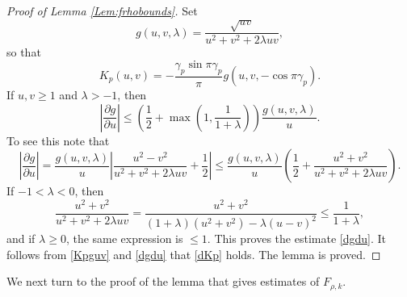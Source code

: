 \documentclass{article}
\numberwithin{equation}{section}
\numberwithin{figure}{section}
\theoremstyle{plain}
\theoremstyle{plain}
\numberwithin{thm}{section}
\theoremstyle{remark}
\let \le \leqslant
\let \ge \geqslant
\begin{document}
\begin{proof}[Proof of Lemma \ref{Lem:frhobounds}]
Set
\begin{equation*}
g(u,v,\lambda)=\frac{\sqrt{uv}}{u^2+v^2+2\lambda uv},
\end{equation*}
so that
\begin{equation}\label{Kpguv}
K_p(u,v)=-\frac{\gamma_p\sin\pi\gamma_p}{\pi}g(u,v,-\cos\pi\gamma_p).
\end{equation}
If $u,v\ge 1$ and $\lambda>-1$, then
\begin{equation}\label{dgdu}
\left|\frac{\partial g}{\partial u}\right|\le \left(\frac 12+\max(1,\frac 1{1+\lambda})\right)\frac{g(u,v,\lambda)}u.
\end{equation}
To see this note that
\begin{equation*}
\left|\frac{\partial g}{\partial u}\right|=\frac{g(u,v,\lambda)}u\left|\frac{u^2-v^2}{u^2+v^2+2\lambda uv}+\frac 12\right|\le \frac{g(u,v,\lambda)}u
\left(\frac 12+\frac{u^2+v^2}{u^2+v^2+2\lambda uv}\right).
\end{equation*}
If $-1<\lambda<0$, then
\begin{equation*}
\frac{u^2+v^2}{u^2+v^2+2\lambda uv}=\frac{u^2+v^2}{(1+\lambda)(u^2+v^2)-\lambda(u-v)^2}\le\frac 1{1+\lambda},
\end{equation*}
and if $\lambda\ge 0$, the same expression is $\le 1$. This proves the estimate \eqref{dgdu}.
It follows from \eqref{Kpguv} and \eqref{dgdu} that \eqref{dKp} holds.
The lemma is proved.
\end{proof}

We next turn to the proof of the lemma that gives estimates of $F_{\rho,k}$.
\end{document}
